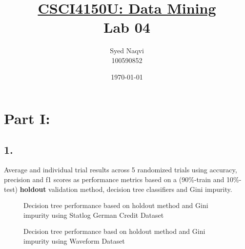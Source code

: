 \documentclass{article}
\title{\textbf{\underline{CSCI4150U: Data Mining}\\Lab 04}}
\author{Syed Naqvi\\100590852}
\date{\today}
\begin{document}
    \maketitle
    
    \section*{Part I:}

    \subsection*{1.}

    Average and individual trial results across 5 randomized trials using accuracy, precision and f1 scores as performance metrics based on
    a (90\%-train and 10\%-test) \textbf{holdout} validation method, decision tree classifiers and Gini impurity.

    \begin{figure}[H]
        \centering
        \begin{minipage}[t]{0.47\textwidth}
            \centering
            \caption{Decision tree performance based on holdout method and Gini impurity using Statlog German Credit Dataset}
        \end{minipage}
        \hfill
        \begin{minipage}[t]{0.47\textwidth}
            \centering
            \caption{Decision tree performance basd on holdout method and Gini impurity using Waveform Dataset}
        \end{minipage}
    \end{figure}

    \newpage
\end{document}
